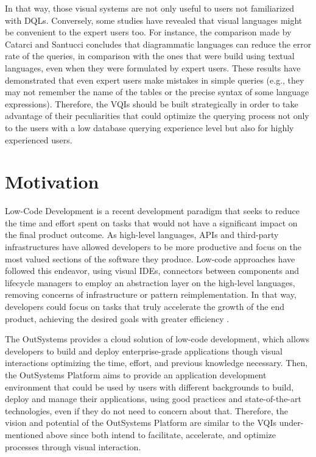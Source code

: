 In that way, those visual systems are not only useful to users not familiarized with \glspl{DQL}. Conversely, some studies have revealed that visual languages might be convenient to the expert users too. For instance, the comparison made by Catarci and Santucci \cite{diagrammaticVsTextualQueryLanguages_aComparativeExperiment} concludes that diagrammatic languages can reduce the error rate of the queries, in comparison with the ones that were build using textual languages, even when they were formulated by expert users. These results have demonstrated that even expert users make mistakes in simple queries (e.g., they may not remember the name of the tables or the precise syntax of some language expressions). Therefore, the \glspl{VQI} should be built strategically in order to take advantage of their peculiarities that could optimize the querying process not only to the users with a low database querying experience level but also for highly experienced users.


\section{Motivation}
\label{sec:motivation}

Low-Code Development is a recent development paradigm that seeks to reduce the time and effort spent on tasks that would not have a significant impact on the final product outcome. As high-level languages, APIs and third-party infrastructures have allowed developers to be more productive and focus on the most valued sections of the software they produce. Low-code approaches have followed this endeavor, using visual \glspl{IDE}, connectors between components and lifecycle managers to employ an abstraction layer on the high-level languages, removing concerns of infrastructure or pattern reimplementation. In that way, developers could focus on tasks that truly accelerate the growth of the end product, achieving the desired goals with greater efficiency \cite{outsystems_whatIsLowCode}.

The OutSystems provides a cloud solution of low-code development, which allows developers to build and deploy enterprise-grade applications though visual interactions optimizing the time, effort, and previous knowledge necessary. Then, the OutSystems Platform aims to provide an application development environment that could be used by users with different backgrounds to build, deploy and manage their applications, using good practices and state-of-the-art technologies, even if they do not need to concern about that. Therefore, the vision and potential of the OutSystems Platform are similar to the \glspl{VQI} under-mentioned above since both intend to facilitate, accelerate, and optimize processes through visual interaction.

